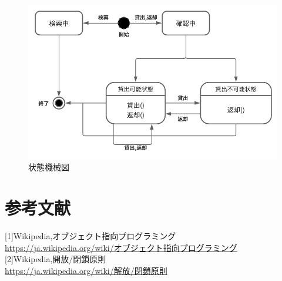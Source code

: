 \documentclass[dvipdfmx,autodetect-engine,titlepage]{jsarticle}
\begin{document}
\begin{figure}[h]
  \centering
  \includegraphics[scale=1]{pic5.png}
  \caption{状態機械図}
\end{figure}

\section{参考文献}

[1]Wikipedia,オブジェクト指向プログラミング\\
\url{https://ja.wikipedia.org/wiki/オブジェクト指向プログラミング}\\

[2]Wikipedia,開放/閉鎖原則\\
\url{https://ja.wikipedia.org/wiki/解放/閉鎖原則}
\end{document}
